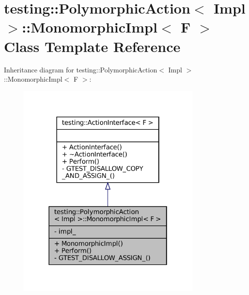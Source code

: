 \hypertarget{classtesting_1_1PolymorphicAction_1_1MonomorphicImpl}{}\section{testing\+:\+:Polymorphic\+Action$<$ Impl $>$\+:\+:Monomorphic\+Impl$<$ F $>$ Class Template Reference}
\label{classtesting_1_1PolymorphicAction_1_1MonomorphicImpl}


Inheritance diagram for testing\+:\+:Polymorphic\+Action$<$ Impl $>$\+:\+:Monomorphic\+Impl$<$ F $>$\+:
\nopagebreak
\begin{figure}[H]
\begin{center}
\leavevmode
\includegraphics[width=262pt]{classtesting_1_1PolymorphicAction_1_1MonomorphicImpl__inherit__graph}
\end{center}
\end{figure}


